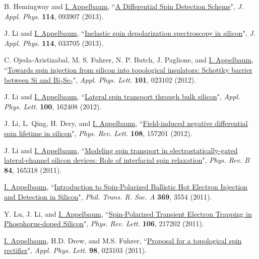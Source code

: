 \documentclass[paper=letter,fontsize=11pt]{scrartcl} %
\newcommand{\PaperEntry}[7]{
		\noindent #1, ``\href{#7}{#2}", \textit{#3} \textbf{#4}, #5 (#6).}
\begin{document}
\begin{etaremune}
\item\PaperEntry{B. Hemingway and \underline{I. Appelbaum}}{A Differential Spin Detection Scheme}{J. Appl. Phys.}{114}{093907}{2013}{http://dx.doi.org/10.1063/1.4820467}

\item\PaperEntry{J. Li and \underline{I. Appelbaum}}{Inelastic spin depolarization spectroscopy in silicon}{J. Appl. Phys.}{114}{033705}{2013}{http://dx.doi.org/10.1063/1.4815873}

\item\PaperEntry{C. Ojeda-Aristizabal, M. S. Fuhrer, N. P. Butch, J. Paglione, and \underline{I. Appelbaum}}{Towards spin injection from silicon into topological insulators: Schottky barrier between Si and Bi$_2$Se$_3$}{Appl. Phys. Lett.}{101}{023102}{2012}{http://dx.doi.org/10.1063/1.4733388}

\item\PaperEntry{J. Li and \underline{I. Appelbaum}}{Lateral spin transport through bulk silicon}{Appl. Phys. Lett.}{100}{162408}{2012}{http://dx.doi.org/10.1063/1.4704802}

\item\PaperEntry{J. Li, L. Qing, H. Dery, and \underline{I. Appelbaum}}{Field-induced negative differential spin lifetime in silicon}{Phys. Rev. Lett.}{108}{157201}{2012}{http://dx.doi.org/10.1103/PhysRevLett.108.157201}

\item\PaperEntry{J. Li and \underline{I. Appelbaum}}{Modeling spin transport in electrostatically-gated lateral-channel silicon devices: Role of interfacial spin relaxation}{Phys. Rev. B}{84}{165318}{2011}{http://dx.doi.org/10.1103/PhysRevB.84.165318}

\item\PaperEntry{\underline{I. Appelbaum}}{Introduction to Spin-Polarized Ballistic Hot Electron Injection and Detection in Silicon}{Phil. Trans. R. Soc. A}{369}{3554}{2011}{http://dx.doi.org/10.1098/rsta.2011.0137}

\item\PaperEntry{Y. Lu, J. Li, and \underline{I. Appelbaum}}{Spin-Polarized Transient Electron Trapping in Phosphorus-doped Silicon}{Phys. Rev. Lett.}{106}{217202}{2011}{http://dx.doi.org/10.1103/PhysRevLett.106.217202}

\item\PaperEntry{\underline{I. Appelbaum}, H.D. Drew, and M.S. Fuhrer}{Proposal for a topological spin rectifier}{Appl. Phys. Lett.}{98}{023103}{2011}{http://dx.doi.org/10.1063/1.3541545}


\end{etaremune}
\end{document}
